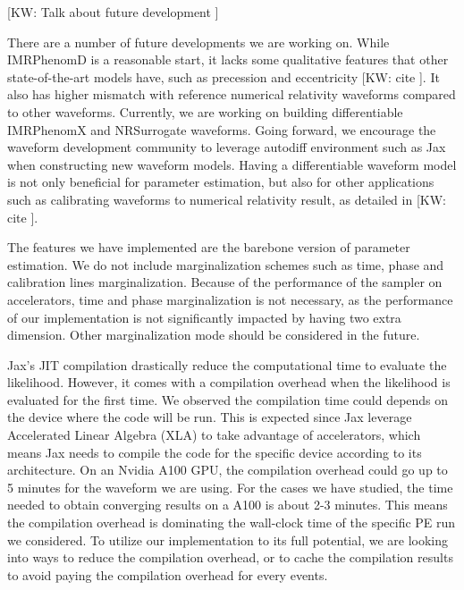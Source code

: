 \documentclass[twocolumn]{aastex631}
\newcommand{\kw}[1]{{\color{rb4}[KW: #1 ]}}
\begin{document}
\kw{Talk about future development}


There are a number of future developments we are working on. While IMRPhenomD is
a reasonable start, it lacks some qualitative features that other
state-of-the-art models have, such as precession and eccentricity \kw{cite}. It
also has higher mismatch with reference numerical relativity waveforms compared
to other waveforms. Currently, we are working on building differentiable
IMRPhenomX and NRSurrogate waveforms. Going forward, we encourage the waveform
development community to leverage autodiff environment such as Jax when
constructing new waveform models. Having a differentiable waveform model is not
only beneficial for parameter estimation, but also for other applications such
as calibrating waveforms to numerical relativity result, as detailed in
\kw{cite}.


The features we have implemented are the barebone version of parameter
estimation. We do not include marginalization schemes such as time, phase and
calibration lines marginalization. Because of the performance of the sampler on
accelerators, time and phase marginalization is not necessary, as the
performance of our implementation is not significantly impacted by having two
extra dimension. Other marginalization mode should be considered in the future.

Jax's JIT compilation drastically reduce the computational time to evaluate the
likelihood. However, it comes with a compilation overhead when the likelihood is
evaluated for the first time. We observed the compilation time could depends on
the device where the code will be run. This is expected since Jax leverage
Accelerated Linear Algebra (XLA) to take advantage of accelerators, which means
Jax needs to compile the code for the specific device according to its
architecture. On an Nvidia A100 GPU, the compilation overhead could go up to 5
minutes for the waveform we are using. For the cases we have studied, the time
needed to obtain converging results on a A100 is about 2-3 minutes. This means
the compilation overhead is dominating the wall-clock time of the specific PE
run we considered. To utilize our implementation to its full potential, we are
looking into ways to reduce the compilation overhead, or to cache the
compilation results to avoid paying the compilation overhead for every events.
\end{document}
